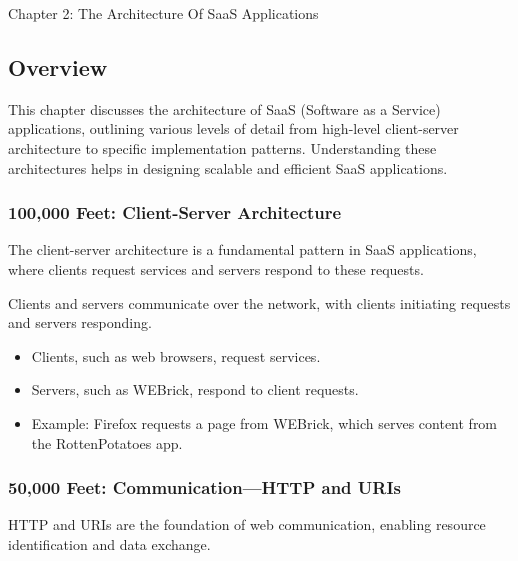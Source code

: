 \begin{notes}{Chapter 2: The Architecture Of SaaS Applications}
    \subsection*{Overview}

    This chapter discusses the architecture of SaaS (Software as a Service) applications, outlining various levels of detail from high-level client-server architecture to specific implementation patterns. 
    Understanding these architectures helps in designing scalable and efficient SaaS applications.
    
    \subsubsection*{100,000 Feet: Client-Server Architecture}
    
    The client-server architecture is a fundamental pattern in SaaS applications, where clients request services and servers respond to these requests.
    
    \begin{highlight}
    
        Clients and servers communicate over the network, with clients initiating requests and servers responding.
        
        \begin{itemize}
            \item Clients, such as web browsers, request services.
            \item Servers, such as WEBrick, respond to client requests.
            \item Example: Firefox requests a page from WEBrick, which serves content from the RottenPotatoes app.
        \end{itemize}
    
    \end{highlight}
    
    \subsubsection*{50,000 Feet: Communication—HTTP and URIs}
    
    HTTP and URIs are the foundation of web communication, enabling resource identification and data exchange.
    
    \begin{highlight}
    

\end{highlight}
\end{notes}
